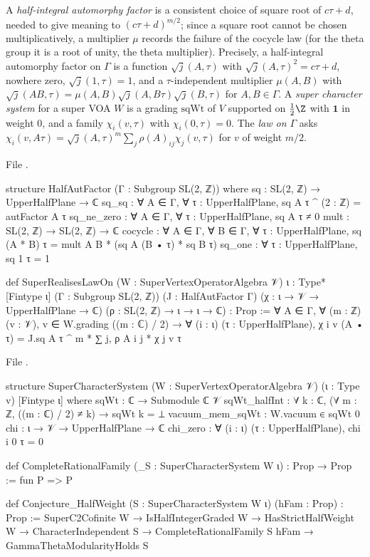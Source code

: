 \begin{definition}\label{l14:def:halfaut}
A \emph{half-integral automorphy factor} is a consistent choice of square root of $c\tau+d$, needed to give meaning to
$(c\tau+d)^{m/2}$; since a square root cannot be chosen multiplicatively, a multiplier $\mu$ records the failure of the cocycle
law (for the theta group it is a root of unity, the theta multiplier). Precisely, a half-integral automorphy factor on $\Gamma$
is a function $\sqrt{j}(A,\tau)$ with $\sqrt j(A,\tau)^2 = c\tau+d$, nowhere
zero, $\sqrt j(1,\tau) = 1$, and a $\tau$-independent multiplier $\mu(A,B)$ with $\sqrt j(AB,\tau) =
\mu(A,B)\sqrt j(A,B\tau)\sqrt j(B,\tau)$ for $A,B\in\Gamma$. A \emph{super character system} for a super VOA $W$ is a grading
$\mathrm{sqWt}$ of $V$ supported on $\frac12\Z$ with $\mathbf 1$ in weight $0$, and a family $\chi_i(v,\tau)$ with
$\chi_i(0,\tau) = 0$. The \emph{law on $\Gamma$} asks $\chi_i(v,A\tau) = \sqrt j(A,\tau)^m\sum_j\rho(A)_{ij}\chi_j(v,\tau)$ for
$v$ of weight $m/2$.
\end{definition}
\noindent File .
\begin{leancode}
structure HalfAutFactor (Γ : Subgroup SL(2, ℤ)) where
  sq : SL(2, ℤ) → UpperHalfPlane → ℂ
  sq_sq : ∀ A ∈ Γ, ∀ τ : UpperHalfPlane, sq A τ ^ (2 : ℤ) = autFactor A τ
  sq_ne_zero : ∀ A ∈ Γ, ∀ τ : UpperHalfPlane, sq A τ ≠ 0
  mult : SL(2, ℤ) → SL(2, ℤ) → ℂ
  cocycle : ∀ A ∈ Γ, ∀ B ∈ Γ, ∀ τ : UpperHalfPlane,
    sq (A * B) τ = mult A B * (sq A (B • τ) * sq B τ)
  sq_one : ∀ τ : UpperHalfPlane, sq 1 τ = 1

def SuperRealisesLawOn (W : SuperVertexOperatorAlgebra 𝒱) {ι : Type*} [Fintype ι]
    (Γ : Subgroup SL(2, ℤ)) (J : HalfAutFactor Γ)
    (χ : ι → 𝒱 → UpperHalfPlane → ℂ) (ρ : SL(2, ℤ) → ι → ι → ℂ) : Prop :=
  ∀ A ∈ Γ, ∀ (m : ℤ) (v : 𝒱), v ∈ W.grading ((m : ℂ) / 2) → ∀ (i : ι) (τ : UpperHalfPlane),
    χ i v (A • τ) = J.sq A τ ^ m * ∑ j, ρ A i j * χ j v τ
\end{leancode}
\noindent File .
\begin{leancode}
structure SuperCharacterSystem (W : SuperVertexOperatorAlgebra 𝒱) (ι : Type v) [Fintype ι] where
  sqWt : ℂ → Submodule ℂ 𝒱
  sqWt_halfInt : ∀ k : ℂ, (∀ m : ℤ, ((m : ℂ) / 2) ≠ k) → sqWt k = ⊥
  vacuum_mem_sqWt : W.vacuum ∈ sqWt 0
  chi : ι → 𝒱 → UpperHalfPlane → ℂ
  chi_zero : ∀ (i : ι) (τ : UpperHalfPlane), chi i 0 τ = 0

def CompleteRationalFamily (_S : SuperCharacterSystem W ι) : Prop → Prop := fun P => P

def Conjecture_HalfWeight (S : SuperCharacterSystem W ι) (hFam : Prop) : Prop :=
  SuperC2Cofinite W → IsHalfIntegerGraded W → HasStrictHalfWeight W →
    CharacterIndependent S → CompleteRationalFamily S hFam → GammaThetaModularityHolds S
\end{leancode}
